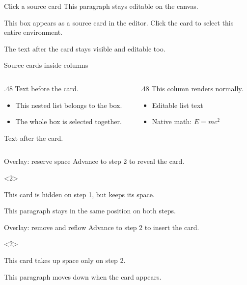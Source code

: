 \documentclass[aspectratio=169]{beamer}
\begin{document}
\begin{frame}[t]{Click a source card}
  This paragraph stays editable on the canvas.

  \begin{tcolorbox}[title=An unsupported environment]
    This box appears as a source card in the editor.
    Click the card to select this entire environment.
  \end{tcolorbox}

  The text after the card stays visible and editable too.
\end{frame}

\begin{frame}[t]{Source cards inside columns}
  \begin{columns}[t]
    \begin{column}{.48\textwidth}
      Text before the card.

      \begin{tcolorbox}[title=Preserved source]
        \begin{itemize}
          \item This nested list belongs to the box.
          \item The whole box is selected together.
        \end{itemize}
      \end{tcolorbox}

      Text after the card.
    \end{column}
    \begin{column}{.48\textwidth}
      This column renders normally.

      \begin{itemize}
        \item Editable list text
        \item Native math: \(E = mc^2\)
      \end{itemize}
    \end{column}
  \end{columns}
\end{frame}

\begin{frame}[t]{Overlay: reserve space}
  Advance to step 2 to reveal the card.

  \begin{uncoverenv}<2>
    \begin{tcolorbox}
      This card is hidden on step 1, but keeps its space.
    \end{tcolorbox}
  \end{uncoverenv}

  This paragraph stays in the same position on both steps.
\end{frame}

\begin{frame}[t]{Overlay: remove and reflow}
  Advance to step 2 to insert the card.

  \begin{onlyenv}<2>
    \begin{tcolorbox}
      This card takes up space only on step 2.
    \end{tcolorbox}
  \end{onlyenv}

  This paragraph moves down when the card appears.
\end{frame}
\end{document}
